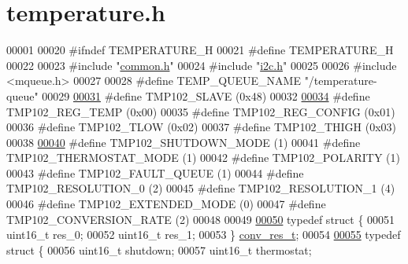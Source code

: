\hypertarget{temperature_8h_source}{}\section{temperature.\+h}
\label{temperature_8h_source}

\begin{DoxyCode}
00001 
00020 \textcolor{preprocessor}{#ifndef TEMPERATURE\_H}
00021 \textcolor{preprocessor}{#define TEMPERATURE\_H}
00022 
00023 \textcolor{preprocessor}{#include "\hyperlink{common_8h}{common.h}"}
00024 \textcolor{preprocessor}{#include "\hyperlink{i2c_8h}{i2c.h}"}
00025 
00026 \textcolor{preprocessor}{#include <mqueue.h>}
00027 
00028 \textcolor{preprocessor}{#define TEMP\_QUEUE\_NAME "/temperature-queue"}
00029 
\hyperlink{temperature_8h_a52b51038057cc25cb63a5cc9c1b3a2c0}{00031} \textcolor{preprocessor}{#define TMP102\_SLAVE       (0x48)}
00032 
\hyperlink{temperature_8h_a67feb48f0e5b0886495ad829ae99e75b}{00034} \textcolor{preprocessor}{#define TMP102\_REG\_TEMP    (0x00)}
00035 \textcolor{preprocessor}{#define TMP102\_REG\_CONFIG  (0x01)}
00036 \textcolor{preprocessor}{#define TMP102\_TLOW        (0x02)}
00037 \textcolor{preprocessor}{#define TMP102\_THIGH       (0x03)}
00038 
\hyperlink{temperature_8h_a26deb1cdb6af48dfb3246342d9434321}{00040} \textcolor{preprocessor}{#define TMP102\_SHUTDOWN\_MODE     (1)}
00041 \textcolor{preprocessor}{#define TMP102\_THERMOSTAT\_MODE   (1)}
00042 \textcolor{preprocessor}{#define TMP102\_POLARITY          (1)}
00043 \textcolor{preprocessor}{#define TMP102\_FAULT\_QUEUE       (1)}
00044 \textcolor{preprocessor}{#define TMP102\_RESOLUTION\_0      (2)}
00045 \textcolor{preprocessor}{#define TMP102\_RESOLUTION\_1      (4)}
00046 \textcolor{preprocessor}{#define TMP102\_EXTENDED\_MODE     (0)}
00047 \textcolor{preprocessor}{#define TMP102\_CONVERSION\_RATE   (2)}
00048 
00049 
\hyperlink{structconv__res__t}{00050} \textcolor{keyword}{typedef} \textcolor{keyword}{struct }\{
00051    uint16\_t res\_0;
00052    uint16\_t res\_1;
00053 \} \hyperlink{structconv__res__t}{conv\_res\_t};
00054 
\hyperlink{structtmp102__mode__t}{00055} \textcolor{keyword}{typedef} \textcolor{keyword}{struct }\{
00056    uint16\_t shutdown;
00057    uint16\_t thermostat;

\end{DoxyCode}
